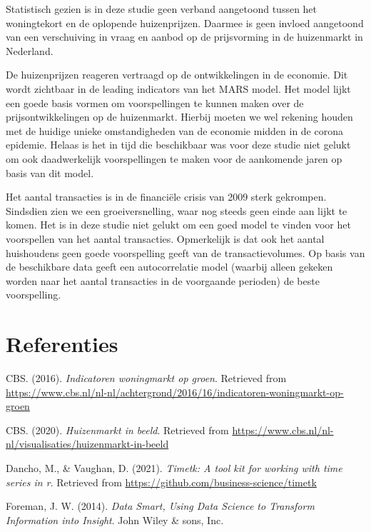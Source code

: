 \documentclass[
]{article}
\begin{document}
Statistisch gezien is in deze studie geen verband aangetoond tussen het
woningtekort en de oplopende huizenprijzen. Daarmee is geen invloed
aangetoond van een verschuiving in vraag en aanbod op de prijsvorming in
de huizenmarkt in Nederland.

De huizenprijzen reageren vertraagd op de ontwikkelingen in de economie.
Dit wordt zichtbaar in de leading indicators van het MARS model. Het
model lijkt een goede basis vormen om voorspellingen te kunnen maken
over de prijsontwikkelingen op de huizenmarkt. Hierbij moeten we wel
rekening houden met de huidige unieke omstandigheden van de economie
midden in de corona epidemie. Helaas is het in tijd die beschikbaar was
voor deze studie niet gelukt om ook daadwerkelijk voorspellingen te
maken voor de aankomende jaren op basis van dit model.

Het aantal transacties is in de financiële crisis van 2009 sterk
gekrompen. Sindsdien zien we een groeiversnelling, waar nog steeds geen
einde aan lijkt te komen. Het is in deze studie niet gelukt om een goed
model te vinden voor het voorspellen van het aantal transacties.
Opmerkelijk is dat ook het aantal huishoudens geen goede voorspelling
geeft van de transactievolumes. Op basis van de beschikbare data geeft
een autocorrelatie model (waarbij alleen gekeken worden naar het aantal
transacties in de voorgaande perioden) de beste voorspelling.

\hypertarget{referenties}{%
\section*{Referenties}\label{referenties}}

\hypertarget{refs}{}
\leavevmode\hypertarget{ref-CBS2016}{}%
CBS. (2016). \emph{Indicatoren woningmarkt op groen}. Retrieved from
\url{https://www.cbs.nl/nl-nl/achtergrond/2016/16/indicatoren-woningmarkt-op-groen}

\leavevmode\hypertarget{ref-CBS2020a}{}%
CBS. (2020). \emph{Huizenmarkt in beeld}. Retrieved from
\url{https://www.cbs.nl/nl-nl/visualisaties/huizenmarkt-in-beeld}

\leavevmode\hypertarget{ref-R-timetk}{}%
Dancho, M., \& Vaughan, D. (2021). \emph{Timetk: A tool kit for working
with time series in r}. Retrieved from
\url{https://github.com/business-science/timetk}

\leavevmode\hypertarget{ref-Foreman2014}{}%
Foreman, J. W. (2014). \emph{Data Smart, Using Data Science to Transform
Information into Insight}. John Wiley \& sons, Inc.
\end{document}
